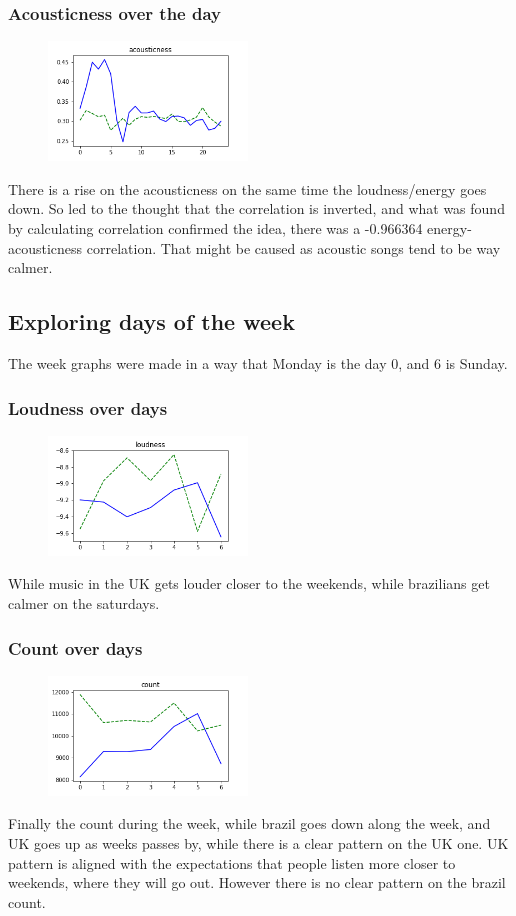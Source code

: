 \documentclass[a4paper]{article}
\begin{document}
\subsubsection{Acousticness over the day}
\begin{figure}[h]
\centering
\includegraphics[width=200px]{acousticness_daily.png}
\end{figure}
There is a rise on the acousticness on the same time the loudness/energy goes down. So led to the thought that the correlation is inverted, and what was found by calculating correlation confirmed the idea, there was a -0.966364  energy-acousticness correlation. That might be caused as acoustic songs tend to be way calmer.
\newpage
\subsection{Exploring days of the week}
The week graphs were made in a way that Monday is the day 0, and 6 is Sunday. 
\subsubsection{Loudness over days}
\begin{figure}[h]
\centering
\includegraphics[width=200px]{loudness_weekly.png}
\end{figure}
While music in the UK gets louder closer to the weekends, while brazilians get calmer on the saturdays.
\subsubsection{Count over days}
\begin{figure}[h]
\centering
\includegraphics[width=200px]{count_weekly.png}
\end{figure}
Finally the count during the week, while brazil goes down along the week, and UK goes up as weeks passes by, while there is a clear pattern on the UK one. UK pattern is aligned with the expectations that people listen more closer to weekends, where they will go out. However there is no clear pattern on the brazil count.
\end{document}
